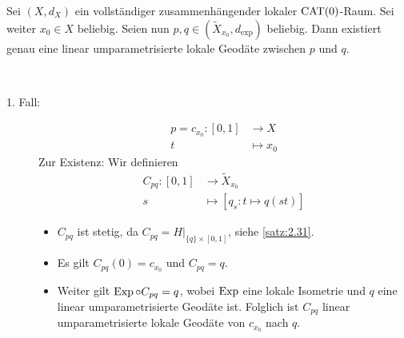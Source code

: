 \begin{lemma}
\label{lemma:2.38}
	Sei $(X,d_X)$ ein vollständiger zusammenhängender lokaler $\operatorname{CAT(0)}$-Raum.
	Sei weiter $x_0 \in X$ beliebig.
	Seien nun $p,q \in (\tilde{X}_{x_0},d_{\exp})$ beliebig.
	Dann existiert genau eine linear umparametrisierte lokale Geodäte zwischen $p$ und $q$.
\end{lemma}
\newpage
\begin{beweis}
	\mbox{} \\[-.9cm]
	\begin{description}
		\item[1. Fall:] \begin{align*}
			p = c_{x_0}\colon [0,1] &\longrightarrow X \\
			t &\longmapsto x_0
		\end{align*} 
		Zur Existenz: Wir definieren
		\begin{align*}
			C_{pq}\colon [0,1] &\longrightarrow \tilde{X}_{x_0} \\
			s &\longmapsto [q_s \colon t \mapsto q(st)]
		\end{align*}
		\begin{itemize}
			\item $C_{pq}$ ist stetig, da $C_{pq} = H \big|_{\{q\} \times [0,1]}$, siehe \autoref{satz:2.31}.
			\item Es gilt $C_{pq}(0) = c_{x_0}$ und $C_{pq} = q$.
			\item Weiter gilt $\operatorname{Exp} \circ C_{pq} = q$, wobei $\operatorname{Exp}$ eine lokale Isometrie und $q$ eine linear umparametrisierte Geodäte ist.
			Folglich ist $C_{pq}$ linear umparametrisierte lokale Geodäte von $c_{x_0}$ nach $q.$
		\end{itemize}
		

\end{description}
\end{beweis}
